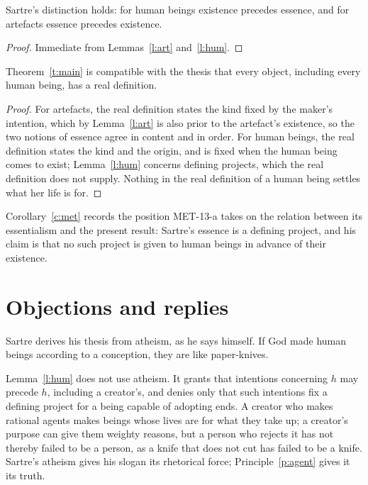 \documentclass{situationist-preprint}
\begin{document}
\begin{theorem}\label{t:main}
Sartre's distinction holds: for human beings existence precedes essence, and for artefacts essence precedes existence.
\end{theorem}

\begin{proof}
Immediate from Lemmas~\ref{l:art} and~\ref{l:hum}.
\end{proof}

\begin{corollary}\label{c:met}
Theorem~\ref{t:main} is compatible with the thesis that every object, including every human being, has a real definition.
\end{corollary}

\begin{proof}
For artefacts, the real definition states the kind fixed by the maker's intention, which by Lemma~\ref{l:art} is also prior to the artefact's existence, so the two notions of essence agree in content and in order. For human beings, the real definition states the kind and the origin, and is fixed when the human being comes to exist; Lemma~\ref{l:hum} concerns defining projects, which the real definition does not supply. Nothing in the real definition of a human being settles what her life is for.
\end{proof}

Corollary~\ref{c:met} records the position MET-13-a takes on the relation between its essentialism and the present result: Sartre's essence is a defining project, and his claim is that no such project is given to human beings in advance of their existence.

\section{Objections and replies}

\begin{objection}[Theism]\label{o:god}
Sartre derives his thesis from atheism, as he says himself. If God made human beings according to a conception, they are like paper-knives.
\end{objection}

\begin{reply}
Lemma~\ref{l:hum} does not use atheism. It grants that intentions concerning $h$ may precede $h$, including a creator's, and denies only that such intentions fix a defining project for a being capable of adopting ends. A creator who makes rational agents makes beings whose lives are for what they take up; a creator's purpose can give them weighty reasons, but a person who rejects it has not thereby failed to be a person, as a knife that does not cut has failed to be a knife. Sartre's atheism gives his slogan its rhetorical force; Principle~\ref{p:agent} gives it its truth.
\end{reply}
\end{document}
